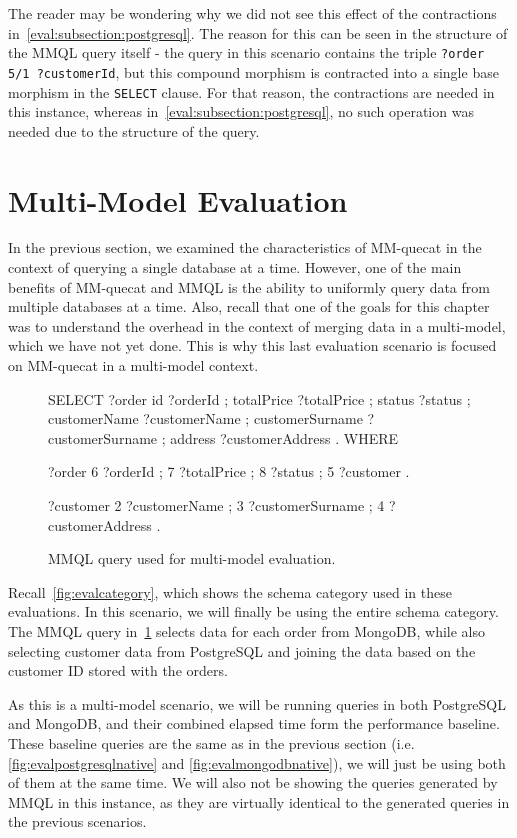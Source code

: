 The reader may be wondering why we did not see this effect of the contractions in~\cref{eval:subsection:postgresql}.
The reason for this can be seen in the structure of the MMQL query itself - the query in this scenario contains the triple \texttt{?order 5/1 ?customerId}, but this compound morphism is contracted into a single base morphism in the \texttt{SELECT} clause.
For that reason, the contractions are needed in this instance, whereas in~\cref{eval:subsection:postgresql}, no such operation was needed due to the structure of the query.

\section{Multi-Model Evaluation}
\label{eval:section:multimodel}

In the previous section, we examined the characteristics of MM-quecat in the context of querying a single database at a time.
However, one of the main benefits of MM-quecat and MMQL is the ability to uniformly query data from multiple databases at a time.
Also, recall that one of the goals for this chapter was to understand the overhead in the context of merging data in a multi-model, which we have not yet done.
This is why this last evaluation scenario is focused on MM-quecat in a multi-model context.

\begin{figure}[ht]
\begin{code}
SELECT {
    ?order id ?orderId ;
        totalPrice ?totalPrice ;
        status ?status ;
        customerName ?customerName ;
        customerSurname ?customerSurname ;
        address ?customerAddress .
}
WHERE {
    ?order 6 ?orderId ;
        7 ?totalPrice ;
        8 ?status ;
        5 ?customer .

    ?customer 2 ?customerName ;
        3 ?customerSurname ;
        4 ?customerAddress .
}
\end{code}
\caption{MMQL query used for multi-model evaluation.}\label{fig:evalmultimodelmmql}
\end{figure}

Recall~\cref{fig:evalcategory}, which shows the schema category used in these evaluations.
In this scenario, we will finally be using the entire schema category.
The MMQL query in~\cref{fig:evalmultimodelmmql} selects data for each order from MongoDB, while also selecting customer data from PostgreSQL and joining the data based on the customer ID stored with the orders.

As this is a multi-model scenario, we will be running queries in both PostgreSQL and MongoDB, and their combined elapsed time form the performance baseline.
These baseline queries are the same as in the previous section (i.e. \cref{fig:evalpostgresqlnative} and \cref{fig:evalmongodbnative}), we will just be using both of them at the same time.
We will also not be showing the queries generated by MMQL in this instance, as they are virtually identical to the generated queries in the previous scenarios.

